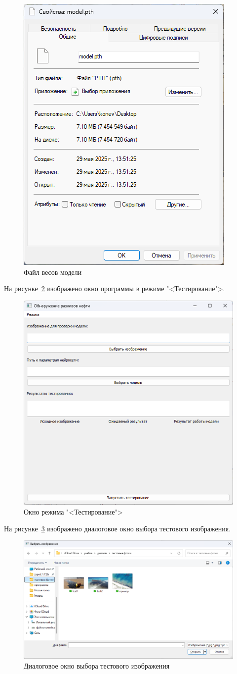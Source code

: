 \begin{figure}[H]
	\centering
	\includegraphics[width=0.5\linewidth]{"images/сохраненная модель"}
	\caption{Файл весов модели}
	\label{fig:saved_weights}
\end{figure}

На рисунке~\ref{fig:test_ui_default} изображено окно программы в режиме "<Тестирование">.
\begin{figure}[H]
	\centering
	\includegraphics[width=0.7\linewidth]{"images/тестирование интерфейс"}
	\caption{Окно режима "<Тестирование">}
	\label{fig:test_ui_default}
\end{figure}

На рисунке~\ref{fig:test_image_select} изображено диалоговое окно выбора тестового изображения.
\begin{figure}[H]
	\centering
	\includegraphics[width=0.7\linewidth]{"images/выбор анализируемого изображения"}
	\caption{Диалоговое окно выбора тестового изображения}
	\label{fig:test_image_select}
\end{figure}

